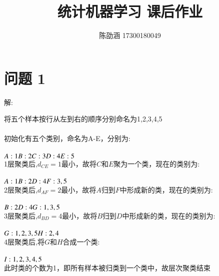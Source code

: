 \documentclass[]{article}
\title{统计机器学习 课后作业}
\author{陈劭涵 17300180049}
\begin{document}
	
\maketitle


\section{问题 1}
\begin{flushleft}
解:
\end{flushleft}
将五个样本按行从左到右的顺序分别命名为1,2,3,4,5\\\\
初始化有五个类别，命名为A-E，分别为:\\\\
$A:1\\
B:2\\
C:3\\
D:4\\
E:5\\
$\\
1层聚类后,$d_{CE}=1$最小，故将$C$和$E$聚为一个类，现在的类别为:\\\\
$A:1\\
B:2\\
D:4\\
F:3,5\\
$\\
2层聚类后,$d_{AF}=2$最小，故将$A$归到$F$中形成新的类，现在的类别为:\\\\
$B:2\\
D:4\\
G:1,3,5\\
$\\
3层聚类后,$d_{BD}=4$最小，故将$B$归到$D$中形成新的类，现在的类别为:\\\\
$G:1,2,3,5\\
H:2,4\\
$\\
4层聚类后,将$G$和$H$合成一个类:\\\\
$I:1,2,3,4,5\\
$\\
此时类的个数为1，即所有样本被归类到一个类中，故层次聚类结束\\\\
\end{document}
